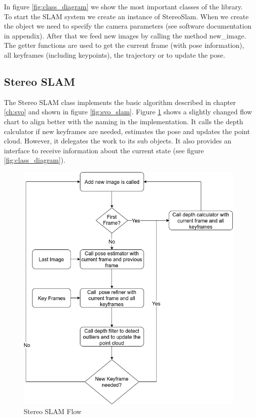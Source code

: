 \documentclass[11pt,a4paper,titlepage,oneside]{report}
\begin{document}
In figure \ref{fig:class_diagram} we show the most important classes of the library. To start the SLAM system we create an instance of StereoSlam. When we create the object we need to specify the camera parameters (see software documentation in appendix). After that we feed new images by calling the method new\_image. The getter functions are used to get the current frame (with pose information), all keyframes (including keypoints), the trajectory or to update the pose.

\subsection{Stereo SLAM}

The Stereo SLAM class implements the basic algorithm described in chapter \ref{ch:svo} and shown in figure \ref{fig:svo_slam}. Figure \ref{fig:flow_stereo_slam} shows a slightly changed flow chart to align better with the naming in the implementation. It calls the depth calculator if new keyframes are needed, estimates the pose and updates the point cloud. However, it delegates the work to its sub objects. It also provides an interface to receive information about the current state (see figure \ref{fig:class_diagram}).

\begin{figure}[H]
  \centering
  \includegraphics[scale=0.3]{img/flow_stereo_slam.png}
  \caption{Stereo SLAM Flow}\label{fig:flow_stereo_slam}
\end{figure}
\end{document}
